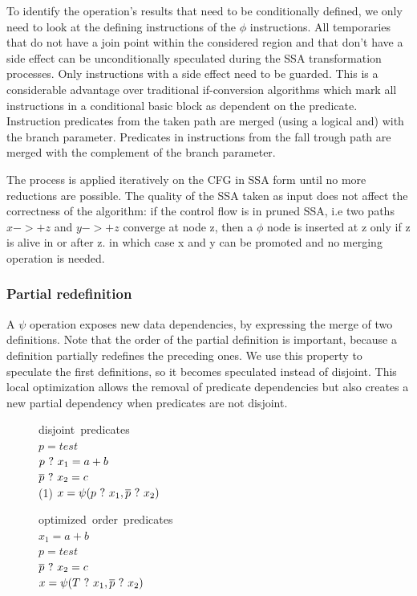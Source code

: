 To identify the operation's results that need to be conditionally defined, we only need to look at the defining instructions of the $\phi$ instructions. All temporaries that do not have a join point within the considered region and that don't have a side effect can be unconditionally speculated during the SSA transformation processes. Only instructions with a side effect need to be guarded. This is a considerable advantage over traditional if-conversion algorithms which mark all instructions in a conditional basic block as dependent on the predicate.
Instruction predicates from the taken path are merged (using a logical and) with the branch parameter. Predicates in instructions from the fall trough path are merged with the complement of the branch parameter.

The process is applied iteratively on the CFG in SSA form until no more reductions are possible. The quality of the SSA taken as input does not affect the correctness of the algorithm: if the control flow is in pruned SSA, i.e two paths $x->+z$ and $y->+z$ converge at node z, then a $\phi$ node is inserted at z only if z is alive in or after z. in which case x and y can be promoted and no merging operation is needed. 

\subsubsection{Partial redefinition}

A $\psi$ operation exposes new data dependencies, by expressing the merge of two definitions. Note that the order of the partial definition is important, because a definition partially redefines the preceding ones. We use this property to speculate the first definitions, so it becomes speculated instead of disjoint. This local optimization allows the removal of predicate dependencies but also creates a new partial dependency when predicates are not disjoint. 

\begin{figure}
\footnotesize
\begin{minipage}[t]{4cm}
\mbox{disjoint predicates} \\
$ p = test $ \\
$ p ~?~ x_1 = a + b $ \\
$ \overline{p} ~?~ x_2 = c $ \\
(1) $ x = \psi(p ~?~ x_1, \overline{p} ~?~ x_2) $ \\
\end{minipage}
\begin{minipage}[t]{4cm}
\mbox{optimized order predicates} \\
$ x_1 = a + b $ \\
$ p = test $ \\
$ \overline{p} ~?~ x_2 = c $ \\
$ x = \psi(T ~?~ x_1, \overline{p} ~?~ x_2) $ \\
\end{minipage}
\end{figure}

